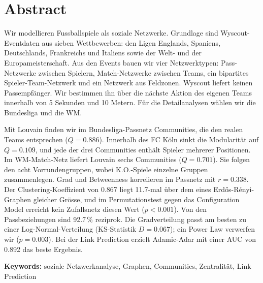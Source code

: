 \section*{Abstract}
\noindent
Wir modellieren Fussballspiele als soziale Netzwerke. Grundlage sind Wyscout-Eventdaten aus sieben Wettbewerben: den Ligen Englands, Spaniens, Deutschlands, Frankreichs und Italiens sowie der Welt- und der Europameisterschaft. Aus den Events bauen wir vier Netzwerktypen: Pass-Netzwerke zwischen Spielern, Match-Netzwerke zwischen Teams, ein bipartites Spieler-Team-Netzwerk und ein Netzwerk aus Feldzonen. Wyscout liefert keinen Passempf\"anger. Wir bestimmen ihn \"uber die n\"achste Aktion des eigenen Teams innerhalb von 5 Sekunden und 10 Metern. F\"ur die Detailanalysen w\"ahlen wir die Bundesliga und die WM.

Mit Louvain finden wir im Bundesliga-Passnetz Communities, die den realen Teams entsprechen ($Q = 0.886$). Innerhalb des FC K\"oln sinkt die Modularit\"at auf $Q = 0.109$, und jede der drei Communities enth\"alt Spieler mehrerer Positionen. Im WM-Match-Netz liefert Louvain sechs Communities ($Q = 0.701$). Sie folgen den acht Vorrundengruppen, wobei K.O.-Spiele einzelne Gruppen zusammenlegen. Grad und Betweenness korrelieren im Passnetz mit $r = 0.338$. Der Clustering-Koeffizient von 0.867 liegt 11.7-mal \"uber dem eines Erd\H{o}s-R\'enyi-Graphen gleicher Gr\"osse, und im Permutationstest gegen das Configuration Model erreicht kein Zufallsnetz diesen Wert ($p < 0.001$). Von den Passbeziehungen sind 92.7\,\% reziprok. Die Gradverteilung passt am besten zu einer Log-Normal-Verteilung (KS-Statistik $D = 0.067$); ein Power Law verwerfen wir ($p = 0.003$). Bei der Link Prediction erzielt Adamic-Adar mit einer AUC von 0.892 das beste Ergebnis.

\vspace{2ex}

\noindent\textbf{Keywords:} soziale Netzwerkanalyse, Graphen, Communities, Zentralit\"at, Link Prediction

\clearpage
